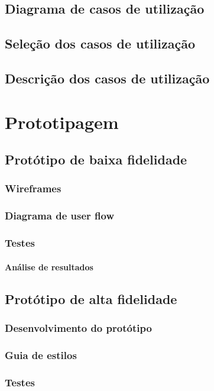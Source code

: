\documentclass[11pt, twoside]{report}
\begin{document}
	\section{Diagrama de casos de utilização}
	\section{Seleção dos casos de utilização}
	\section{Descrição dos casos de utilização}
	
	\chapter{Prototipagem}
	\section{Protótipo de baixa fidelidade}
	\subsection{Wireframes}
	\subsection{Diagrama de user flow}
	\subsection{Testes}
	\subsubsection{Análise de resultados}
	
	\section{Protótipo de alta fidelidade}
	\subsection{Desenvolvimento do protótipo}
	\subsection{Guia de estilos}
	\subsection{Testes}
\end{document}
